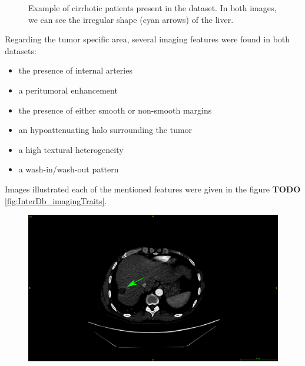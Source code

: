 {\begin{figure}[!ht]
\begin{mdframed}[backgroundcolor=blue!50,linecolor=blue!50]
\begin{minipage}{0.45\linewidth}
		\end{minipage}
	\end{mdframed}
	\caption{Example of cirrhotic patients present in the \textbf{} dataset. In both images, we can see the irregular shape (cyan arrows) of the liver.}
	\label{fig:GDb_diseasedLivers}
\end{figure}
Regarding the tumor specific area, several imaging features were found in both datasets:
\begin{itemize}
\item the presence of internal arteries
\item a peritumoral enhancement
\item the presence of either smooth or non-smooth margins
\item an hypoattenuating halo surrounding the tumor
\item a high textural heterogeneity
\item a wash-in/wash-out pattern 
\end{itemize}
Images illustrated each of the mentioned features were given in the figure \textbf{TODO} \ref{fig:InterDb_imagingTraits}.
\begin{figure}[!ht]
	\begin{mdframed}[backgroundcolor=blue!50,linecolor=blue!50]
		\centering
		\begin{minipage}{0.45\linewidth}
			\includegraphics[width=\linewidth]{images/ImagingTraits/GDB_peritumoralEnhancement}
		\end{minipage} \hspace{-0.1cm}
		\begin{minipage}{0.45\linewidth}

\end{minipage}
\end{mdframed}
\end{figure}}
